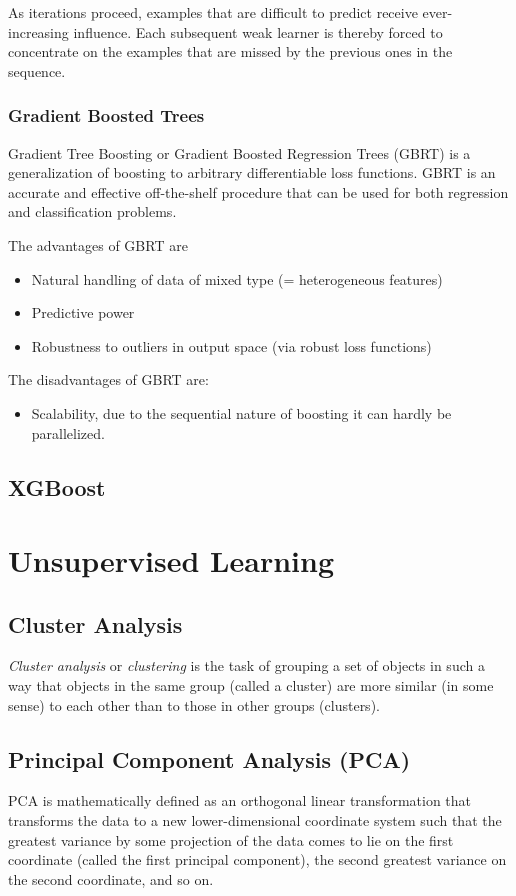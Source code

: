 \documentclass[11pt]{article}
\theoremstyle{plain}
\theoremstyle{definition}
\begin{document}
As iterations proceed, examples that are difficult to predict receive ever-increasing influence. Each subsequent weak learner is thereby forced to concentrate on the examples that are missed by the previous ones in the sequence.

\subsubsection{Gradient Boosted Trees}
Gradient Tree Boosting or Gradient Boosted Regression Trees (GBRT) is a generalization of boosting to arbitrary differentiable loss functions. GBRT is an accurate and effective off-the-shelf procedure that can be used for both regression and classification problems. 

The advantages of GBRT are
\begin{itemize}
\item Natural handling of data of mixed type (= heterogeneous features)
\item Predictive power
\item Robustness to outliers in output space (via robust loss functions)
\end{itemize}

The disadvantages of GBRT are:
\begin{itemize}
	\item Scalability, due to the sequential nature of boosting it can hardly be parallelized.
\end{itemize}

\subsection{XGBoost}



\section{Unsupervised Learning}

\subsection{Cluster Analysis}
\textit{Cluster analysis} or \textit{clustering} is the task of grouping a set of objects in such a way that objects in the same group (called a cluster) are more similar (in some sense) to each other than to those in other groups (clusters).

\subsection{Principal Component Analysis (PCA)}
PCA is mathematically defined as an orthogonal linear transformation that transforms the data to a new lower-dimensional coordinate system such that the greatest variance by some projection of the data comes to lie on the first coordinate (called the first principal component), the second greatest variance on the second coordinate, and so on.
\end{document}
